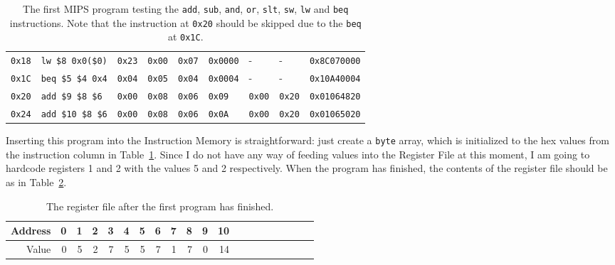 \begin{table}
\begin{adjustbox}{center}
\begin{tabular}{rllllllll}
        \texttt{0x18} & \texttt{lw \$8  0x0(\$0)} & \texttt{0x23} &
        \texttt{0x00} & \texttt{0x07} & \texttt{0x0000} & - &
        - & \texttt{0x8C070000} \\ %

        \texttt{0x1C} & \texttt{beq \$5 \$4 0x4} & \texttt{0x04} &
        \texttt{0x05} & \texttt{0x04} & \texttt{0x0004} & - &
        - & \texttt{0x10A40004} \\ %

        \texttt{0x20} & \texttt{add \$9 \$8 \$6} & \texttt{0x00} &
        \texttt{0x08} & \texttt{0x06} & \texttt{0x09} & \texttt{0x00} &
        \texttt{0x20} & \texttt{0x01064820} \\ %

        \texttt{0x24} & \texttt{add \$10 \$8 \$6} & \texttt{0x00} &
        \texttt{0x08} & \texttt{0x06} & \texttt{0x0A} & \texttt{0x00} &
        \texttt{0x20} & \texttt{0x01065020} \\ %
        \hline
    \end{tabular}
    \end{adjustbox}
    \caption{The first MIPS program testing the \texttt{add}, \texttt{sub},
    \texttt{and}, \texttt{or}, \texttt{slt}, \texttt{sw}, \texttt{lw} and
    \texttt{beq} instructions. Note that the instruction at \texttt{0x20}
    should be skipped due to the \texttt{beq} at \texttt{0x1C}.}
    \label{tab:first-program}
\end{table}

Inserting this program into the Instruction Memory is straightforward: just
create a \texttt{byte} array, which is initialized to the hex values from the
instruction column in Table~\ref{tab:first-program}. Since I do not have any
way of feeding values into the Register File at this moment, I am going to
hardcode registers 1 and 2 with the values 5 and 2 respectively. When the
program has finished, the contents of the register file should be as in
Table~\ref{tab:first-result}.
\begin{table}
    \centering
    \begin{tabular}{rrrrrrrrrrrrrrrrrrrr}
        \hline
        Address & 0 & 1 & 2 & 3 & 4 & 5 & 6 & 7 & 8 & 9 & 10 \\
        \hline
        Value & 0 & 5 & 2 & 7 & 5 & 5 & 7 & 1 & 7 & 0 & 14 \\
        \hline
    \end{tabular}
    \caption{The register file after the first program has finished.}
    \label{tab:first-result}
\end{table}

